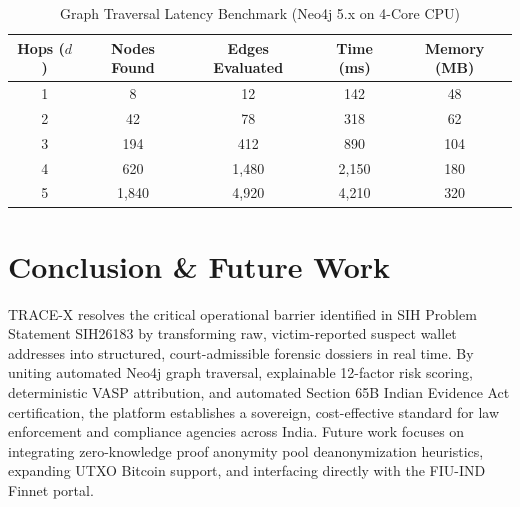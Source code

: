 \documentclass[10pt,twocolumn,a4paper]{article}
\begin{document}
\begin{table}[h]
\centering
\small
\caption{Graph Traversal Latency Benchmark (Neo4j 5.x on 4-Core CPU)}
\label{tab:perf}
\begin{tabularx}{\columnwidth}{ccccc}
\toprule
\textbf{Hops ($d$)} & \textbf{Nodes Found} & \textbf{Edges Evaluated} & \textbf{Time (ms)} & \textbf{Memory (MB)} \\
\midrule
1 & 8 & 12 & 142 & 48 \\
2 & 42 & 78 & 318 & 62 \\
3 & 194 & 412 & 890 & 104 \\
4 & 620 & 1,480 & 2,150 & 180 \\
5 & 1,840 & 4,920 & 4,210 & 320 \\
\bottomrule
\end{tabularx}
\end{table}

\section{Conclusion \& Future Work}
TRACE-X resolves the critical operational barrier identified in SIH Problem Statement SIH26183 by transforming raw, victim-reported suspect wallet addresses into structured, court-admissible forensic dossiers in real time. By uniting automated Neo4j graph traversal, explainable 12-factor risk scoring, deterministic VASP attribution, and automated Section 65B Indian Evidence Act certification, the platform establishes a sovereign, cost-effective standard for law enforcement and compliance agencies across India. Future work focuses on integrating zero-knowledge proof anonymity pool deanonymization heuristics, expanding UTXO Bitcoin support, and interfacing directly with the FIU-IND Finnet portal.
\end{document}
